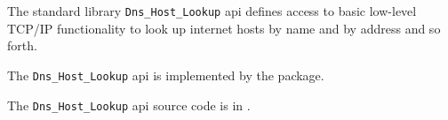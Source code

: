 
The standard library {\tt Dns\_Host\_Lookup} api defines access to basic low-level {\sc TCP/IP} 
functionality to look up internet hosts by name and by address and so forth.

The {\tt Dns\_Host\_Lookup} api is implemented by the  package.

The {\tt Dns\_Host\_Lookup} api source code is in .


